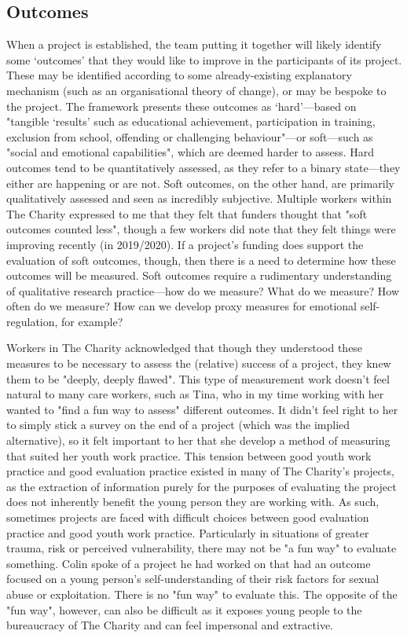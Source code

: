 \subsection{Outcomes}
\label{subsec:6-3-1-outcomes}
When a project is established, the team putting it together will likely identify some ‘outcomes’ that they would like to improve in the participants of its project. These may be identified according to some already-existing explanatory mechanism (such as an organisational theory of change), or may be bespoke to the project. The framework \citep[p. 7]{mcneil_framework_2012} presents these outcomes as `hard'—based on "tangible `results' such as educational achievement, participation in training, exclusion from school, offending or challenging behaviour"—or soft—such as "social and emotional capabilities", which are deemed harder to assess. Hard outcomes tend to be quantitatively assessed, as they refer to a binary state—they either are happening or are not. Soft outcomes, on the other hand, are primarily qualitatively assessed and seen as incredibly subjective. Multiple workers within The Charity expressed to me that they felt that funders thought that "soft outcomes counted less", though a few workers did note that they felt things were improving recently (in 2019/2020). If a project's funding does support the evaluation of soft outcomes, though, then there is a need to determine how these outcomes will be measured. Soft outcomes require a rudimentary understanding of qualitative research practice—how do we measure? What do we measure? How often do we measure? How can we develop proxy measures for emotional self-regulation, for example? 

Workers in The Charity acknowledged that though they understood these measures to be necessary to assess the (relative) success of a project, they knew them to be "deeply, deeply flawed". This type of measurement work doesn't feel natural to many care workers, such as Tina, who in my time working with her wanted to "find a fun way to assess" different outcomes. It didn't feel right to her to simply stick a survey on the end of a project (which was the implied alternative), so it felt important to her that she develop a method of measuring that suited her youth work practice. This tension between good youth work practice and good evaluation practice existed in many of The Charity's projects, as the extraction of information purely for the purposes of evaluating the project does not inherently benefit the young person they are working with. As such, sometimes projects are faced with difficult choices between good evaluation practice and good youth work practice. Particularly in situations of greater trauma, risk or perceived vulnerability, there may not be "a fun way" to evaluate something. Colin spoke of a project he had worked on that had an outcome focused on a young person's self-understanding of their risk factors for sexual abuse or exploitation. There is no "fun way" to evaluate this. The opposite of the "fun way", however, can also be difficult as it exposes young people to the bureaucracy of The Charity and can feel impersonal and extractive. 

